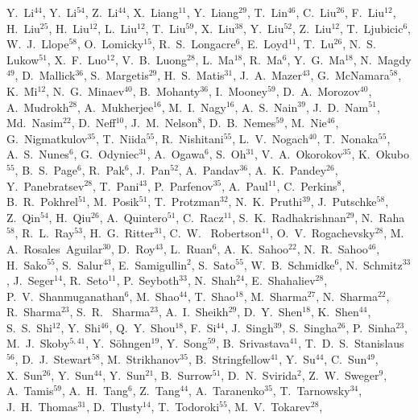 {Y.~Li$^{44}$,
Y.~Li$^{54}$,
Z.~Li$^{44}$,
X.~Liang$^{11}$,
Y.~Liang$^{29}$,
T.~Lin$^{46}$,
C.~Liu$^{26}$,
F.~Liu$^{12}$,
H.~Liu$^{25}$,
H.~Liu$^{12}$,
L.~Liu$^{12}$,
T.~Liu$^{59}$,
X.~Liu$^{38}$,
Y.~Liu$^{52}$,
Z.~Liu$^{12}$,
T.~Ljubicic$^{6}$,
W.~J.~Llope$^{58}$,
O.~Lomicky$^{15}$,
R.~S.~Longacre$^{6}$,
E.~Loyd$^{11}$,
T.~Lu$^{26}$,
N.~S.~ Lukow$^{51}$,
X.~F.~Luo$^{12}$,
V.~B.~Luong$^{28}$,
L.~Ma$^{18}$,
R.~Ma$^{6}$,
Y.~G.~Ma$^{18}$,
N.~Magdy$^{49}$,
D.~Mallick$^{36}$,
S.~Margetis$^{29}$,
H.~S.~Matis$^{31}$,
J.~A.~Mazer$^{43}$,
G.~McNamara$^{58}$,
K.~Mi$^{12}$,
N.~G.~Minaev$^{40}$,
B.~Mohanty$^{36}$,
I.~Mooney$^{59}$,
D.~A.~Morozov$^{40}$,
A.~Mudrokh$^{28}$,
A.~Mukherjee$^{16}$,
M.~I.~Nagy$^{16}$,
A.~S.~Nain$^{39}$,
J.~D.~Nam$^{51}$,
Md.~Nasim$^{22}$,
D.~Neff$^{10}$,
J.~M.~Nelson$^{8}$,
D.~B.~Nemes$^{59}$,
M.~Nie$^{46}$,
G.~Nigmatkulov$^{35}$,
T.~Niida$^{55}$,
R.~Nishitani$^{55}$,
L.~V.~Nogach$^{40}$,
T.~Nonaka$^{55}$,
A.~S.~Nunes$^{6}$,
G.~Odyniec$^{31}$,
A.~Ogawa$^{6}$,
S.~Oh$^{31}$,
V.~A.~Okorokov$^{35}$,
K.~Okubo$^{55}$,
B.~S.~Page$^{6}$,
R.~Pak$^{6}$,
J.~Pan$^{52}$,
A.~Pandav$^{36}$,
A.~K.~Pandey$^{26}$,
Y.~Panebratsev$^{28}$,
T.~Pani$^{43}$,
P.~Parfenov$^{35}$,
A.~Paul$^{11}$,
C.~Perkins$^{8}$,
B.~R.~Pokhrel$^{51}$,
M.~Posik$^{51}$,
T.~Protzman$^{32}$,
N.~K.~Pruthi$^{39}$,
J.~Putschke$^{58}$,
Z.~Qin$^{54}$,
H.~Qiu$^{26}$,
A.~Quintero$^{51}$,
C.~Racz$^{11}$,
S.~K.~Radhakrishnan$^{29}$,
N.~Raha$^{58}$,
R.~L.~Ray$^{53}$,
H.~G.~Ritter$^{31}$,
C.~W.~ Robertson$^{41}$,
O.~V.~Rogachevsky$^{28}$,
M.~ A.~Rosales~Aguilar$^{30}$,
D.~Roy$^{43}$,
L.~Ruan$^{6}$,
A.~K.~Sahoo$^{22}$,
N.~R.~Sahoo$^{46}$,
H.~Sako$^{55}$,
S.~Salur$^{43}$,
E.~Samigullin$^{2}$,
S.~Sato$^{55}$,
W.~B.~Schmidke$^{6}$,
N.~Schmitz$^{33}$,
J.~Seger$^{14}$,
R.~Seto$^{11}$,
P.~Seyboth$^{33}$,
N.~Shah$^{24}$,
E.~Shahaliev$^{28}$,
P.~V.~Shanmuganathan$^{6}$,
M.~Shao$^{44}$,
T.~Shao$^{18}$,
M.~Sharma$^{27}$,
N.~Sharma$^{22}$,
R.~Sharma$^{23}$,
S.~R.~ Sharma$^{23}$,
A.~I.~Sheikh$^{29}$,
D.~Y.~Shen$^{18}$,
K.~Shen$^{44}$,
S.~S.~Shi$^{12}$,
Y.~Shi$^{46}$,
Q.~Y.~Shou$^{18}$,
F.~Si$^{44}$,
J.~Singh$^{39}$,
S.~Singha$^{26}$,
P.~Sinha$^{23}$,
M.~J.~Skoby$^{5,41}$,
Y.~S\"{o}hngen$^{19}$,
Y.~Song$^{59}$,
B.~Srivastava$^{41}$,
T.~D.~S.~Stanislaus$^{56}$,
D.~J.~Stewart$^{58}$,
M.~Strikhanov$^{35}$,
B.~Stringfellow$^{41}$,
Y.~Su$^{44}$,
C.~Sun$^{49}$,
X.~Sun$^{26}$,
Y.~Sun$^{44}$,
Y.~Sun$^{21}$,
B.~Surrow$^{51}$,
D.~N.~Svirida$^{2}$,
Z.~W.~Sweger$^{9}$,
A.~Tamis$^{59}$,
A.~H.~Tang$^{6}$,
Z.~Tang$^{44}$,
A.~Taranenko$^{35}$,
T.~Tarnowsky$^{34}$,
J.~H.~Thomas$^{31}$,
D.~Tlusty$^{14}$,
T.~Todoroki$^{55}$,
M.~V.~Tokarev$^{28}$,
}
